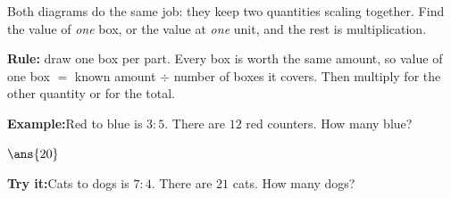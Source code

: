 \documentclass[12pt]{article}
\begin{document}

\noindent\small Both diagrams do the same job: they keep two quantities
scaling together. Find the value of \emph{one} box, or the value at \emph{one}
unit, and the rest is multiplication.
\normalsize

\begin{formulabox}
\textbf{Rule:} draw one box per part. Every box is worth the same amount, so
value of one box $=$ known amount $\div$ number of boxes it covers. Then
multiply for the other quantity or for the total.
\begin{center}
\end{center}
\end{formulabox}
\begin{examplebox}
\textbf{Example:}\quad Red to blue is $3 : 5$. There are $12$ red counters.
How many blue?
\par
$\ans{20}$
\end{examplebox}
\begin{tryitbox}
\textbf{Try it:}\quad Cats to dogs is $7 : 4$. There are $21$ cats. How many
dogs?\\[2pt]
\end{tryitbox}
\end{document}
